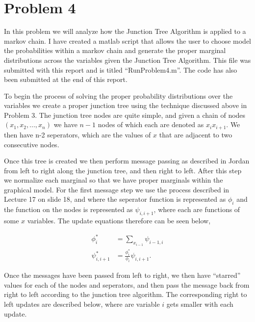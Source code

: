 \documentclass[paper=a4, fontsize=11pt]{scrartcl} %
\begin{document}

\section{Problem 4}
In this problem we will analyze how the Junction Tree Algorithm is applied to a markov chain.
I have created a matlab script that allows the user to choose model the probabilities within a markov chain and generate the proper marginal distributions across the variables given the Junction Tree Algorithm.
This file was submitted with this report and is titled ``RunProblem4.m''.
The code has also been submitted at the end of this report.

To begin the process of solving the proper probability distributions over the variables we create a proper junction tree using the technique discussed above in Problem 3.
The junction tree nodes are quite simple, and given a chain of nodes $(x_1,x_2,...,x_n)$ we have $n-1$ nodes of which each are denoted as $x_{i}x_{i+1}$.
We then have n-2 seperators, which are the values of $x$ that are adjacent to two consecutive nodes.

Once this tree is created we then perform message passing as described in Jordan from left to right along the junction tree, and then right to left.
After this step we normalize each marginal so that we have proper marginals within the graphical model.
For the first message step we use the process described in Lecture 17 on slide 18, and where the seperator function is represented as $\phi_i$ and the function on the nodes is represented as $\psi_{i,i+1}$, where each are functions of some $x$ variables.
The update equations therefore can be seen below,

\begin{align}
\phi_i^* &= \sum_{x_{i-1}} \psi_{i-1,i} \\
\psi_{i,i+1}^* &= \frac{\phi_i^*}{\phi_i}\psi_{i,i+1}.
\end{align}

Once the messages have been passed from left to right, we then have ``starred'' values for each of the nodes and seperators, and then pass the message back from right to left according to the junction tree algorithm.
The corresponding right to left updates are described below, where are variable $i$ gets smaller with each update.
\end{document}
